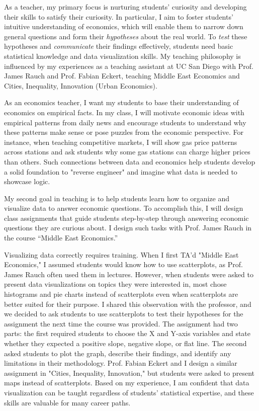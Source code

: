 \documentclass[letterpaper]{article}
\begin{document}
As a teacher, my primary focus is nurturing students' curiosity and developing their skills to satisfy their curiosity. 
In particular, I aim to foster students' intuitive understanding of economics, which will enable them to narrow down general questions and form their \textit{hypotheses} about the real world. To \textit{test} these hypotheses and \textit{communicate} their findings effectively, students need basic statistical knowledge and data visualization skills.
My teaching philosophy is influenced by my experiences as a teaching assistant at UC San Diego with Prof. James Rauch and Prof. Fabian Eckert, teaching Middle East Economics and Cities, Inequality, Innovation (Urban Economics).

As an economics teacher, I want my students to base their understanding of economics on empirical facts. In my class, I will motivate economic ideas with empirical patterns from daily news and encourage students to understand why these patterns make sense or pose puzzles from the economic perspective. For instance, when teaching competitive markets, I will show gas price patterns across stations and ask students why some gas stations can charge higher prices than others. Such connections between data and economics help students develop a solid foundation to "reverse engineer" and imagine what data is needed to showcase logic.

My second goal in teaching is to help students learn how to organize and visualize data to answer economic questions. To accomplish this, I will design class assignments that guide students step-by-step through answering economic questions they are curious about. I design such tasks with Prof. James Rauch in the course ``Middle East Economics.'' 

Visualizing data correctly requires training. When I first TA'd "Middle East Economics," I assumed students would know how to use scatterplots, as Prof. James Rauch often used them in lectures. However, when students were asked to present data visualizations on topics they were interested in, most chose histograms and pie charts instead of scatterplots even when scatterplots are better suited for their purpose. I shared this observation with the professor, and we decided to ask students to use scatterplots to test their hypotheses for the assignment the next time the course was provided. The assignment had two parts: the first required students to choose the X and Y-axis variables and state whether they expected a positive slope, negative slope, or flat line. The second asked students to plot the graph, describe their findings, and identify any limitations in their methodology. Prof. Fabian Eckert and I design a similar assignment in "Cities, Inequality, Innovation," but students were asked to present maps instead of scatterplots. Based on my experience, I am confident that data visualization can be taught regardless of students' statistical expertise, and these skills are valuable for many career paths.
\end{document}
